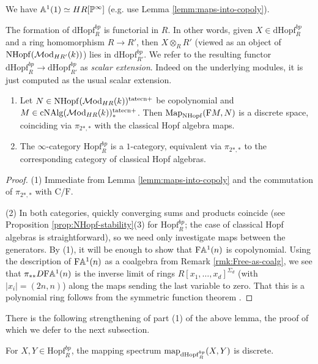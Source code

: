 \documentclass{amsart}
\numberwithin{proposition}{section}
\numberwithin{equation}{section}
\def\tate{\mathrm{tate}}
\def\NHopf{\mathrm{NHopf}}
\def\Hopf{\mathrm{Hopf}}
\def\dHopf{\mathrm{dHopf}}
\def\Hopf{\mathrm{Hopf}}
\def\cNAlg{\mathrm{cNAlg}}
\def\cn{\mathrm{cn}}
\def\Free{\mathrm{F}}
\def\Cofree{\mathrm{C}}
\begin{document}
\begin{example} \label{ex:Poo-A1}
We have $\mathbb A^1(1) \simeq HR[\mathbb P^\infty]$ (e.g. use Lemma \ref{lemm:maps-into-copoly}).
\end{example}

\begin{remark} \label{rmk:Hopf-scalar-ext}
The formation of $\dHopf_R^{bp}$ is functorial in $R$.
In other words, given $X \in \dHopf_R^{bp}$ and a ring homomorphism $R \to R'$, then $X \otimes_R R'$ (viewed as an object of $\NHopf(\Mod_{HR'}(k))$) lies in $\dHopf_{R'}^{bp}$.
We refer to the resulting functor $\dHopf_R^{bp} \to \dHopf_{R'}^{bp}$ as \emph{scalar extension}.
Indeed on the underlying modules, it is just computed as the usual scalar extension.
\end{remark}

\begin{lemma} \label{lemm:NHopf-comp-start}
\begin{enumerate}
\item Let $N \in \NHopf(\Mod_{HR}(k))^{\tate\cn+}$ be copolynomial and $M \in \cNAlg(\Mod_{HR}(k))^{\tate\cn+}_*$.
  Then $\Map_\NHopf(\Free M, N)$ is a discrete space, coinciding via $\pi_{2*,*}$ with the classical Hopf algebra maps.
\item The $\infty$-category $\Hopf_R^{bp}$ is a $1$-category, equivalent via $\pi_{2*,*}$ to the corresponding category of classical Hopf algebras.
\end{enumerate}
\end{lemma}
\begin{proof}
(1) Immediate from Lemma \ref{lemm:maps-into-copoly} and the commutation of $\pi_{2*,*}$ with $\Cofree$/$\Free$.

(2) In both categories, quickly converging sums and products coincide (see Proposition \ref{prop:NHopf-stability}(3) for $\Hopf_R^{bp}$; the case of classical Hopf algebras is straightforward), so we need only investigate maps between the generators.
By (1), it will be enough to show that $\Free\A^1(n)$ is copolynomial.
Using the description of $\Free\A^1(n)$ as a coalgebra from Remark \ref{rmk:Free-as-coalg}, we see that $\pi_{**}D\Free\A^1(n)$ is the inverse limit of rings $R[x_1, \dots, x_d]^{\Sigma_d}$ (with $|x_i| = (2n,n)$) along the maps sending the last variable to zero.
That this is a polynomial ring follows from the symmetric function theorem \cite[Chapter~I, \S2, (2.4)]{macdonald-symmetric-functions}.
\end{proof}

There is the following strengthening of part (1) of the above lemma, the proof of which we defer to the next subsection.
\begin{proposition} \label{prop:dHopfbp-disc}
For $X, Y \in \Hopf_R^{bp}$, the mapping spectrum $\map_{\dHopf_R^{bp}}(X, Y)$ is discrete.
\end{proposition}
\end{document}
